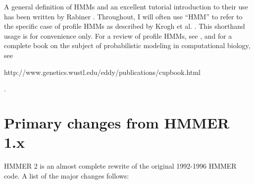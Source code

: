 A general definition of HMMs and an excellent tutorial introduction to
their use has been written by Rabiner \cite{Rabiner89}. Throughout, I
will often use ``HMM'' to refer to the specific case of profile HMMs
as described by Krogh et al. \cite{Krogh94}. This shorthand usage is
for convenience only. For a review of profile HMMs, see \cite{Eddy96},
and for a complete book on the subject of probabilistic modeling in
computational biology, see \cite{Durbin98} 
\begin{htmlonly}
{http://www.genetics.wustl.edu/eddy/publications/cupbook.html}
\end{htmlonly}.

\section{Primary changes from HMMER 1.x}

HMMER 2 is an almost complete rewrite of the original 1992-1996 HMMER
code. A list of the major changes follows:

